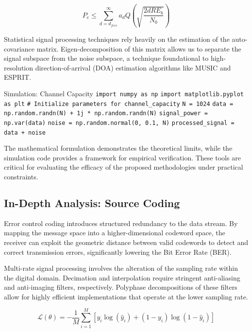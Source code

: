\begin{equation}
    P_e \leq \sum_{d=d_{free}}^{\infty} a_d Q\left(\sqrt{\frac{2 d R E_b}{N_0}}\right)
\end{equation}

Statistical signal processing techniques rely heavily on the estimation of the auto-covariance matrix. Eigen-decomposition of this matrix allows us to separate the signal subspace from the noise subspace, a technique foundational to high-resolution direction-of-arrival (DOA) estimation algorithms like MUSIC and ESPRIT.

\begin{pythonbox}{Simulation: Channel Capacity}
\texttt{import numpy as np}
\texttt{import matplotlib.pyplot as plt}
\texttt{}
\texttt{\# Initialize parameters for channel\_capacity}
\texttt{N = 1024}
\texttt{data = np.random.randn(N) + 1j * np.random.randn(N)}
\texttt{signal\_power = np.var(data)}
\texttt{noise = np.random.normal(0, 0.1, N)}
\texttt{processed\_signal = data + noise}
\end{pythonbox}

\vspace{0.5cm}
The mathematical formulation demonstrates the theoretical limits, while the simulation code provides a framework for empirical verification. These tools are critical for evaluating the efficacy of the proposed methodologies under practical constraints.


\subsection{In-Depth Analysis: Source Coding}
Error control coding introduces structured redundancy to the data stream. By mapping the message space into a higher-dimensional codeword space, the receiver can exploit the geometric distance between valid codewords to detect and correct transmission errors, significantly lowering the Bit Error Rate (BER).

Multi-rate signal processing involves the alteration of the sampling rate within the digital domain. Decimation and interpolation require stringent anti-aliasing and anti-imaging filters, respectively. Polyphase decompositions of these filters allow for highly efficient implementations that operate at the lower sampling rate.

\begin{equation}
    \mathcal{L}(\theta) = -\frac{1}{M} \sum_{i=1}^{M} \left[ y_i \log(\hat{y}_i) + (1-y_i)\log(1-\hat{y}_i) \right]
\end{equation}


